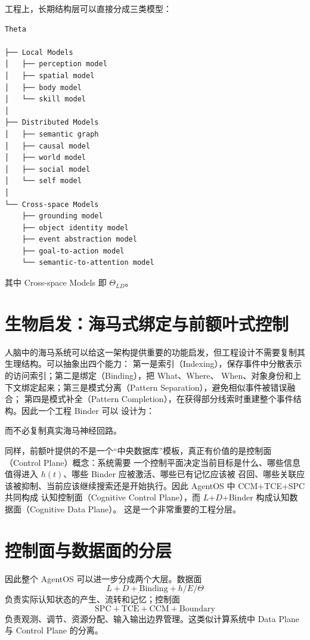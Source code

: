 工程上，长期结构层可以直接分成三类模型：

\begin{verbatim}
Theta

├── Local Models
│   ├── perception model
│   ├── spatial model
│   ├── body model
│   └── skill model
│
├── Distributed Models
│   ├── semantic graph
│   ├── causal model
│   ├── world model
│   ├── social model
│   └── self model
│
└── Cross-space Models
    ├── grounding model
    ├── object identity model
    ├── event abstraction model
    ├── goal-to-action model
    └── semantic-to-attention model
\end{verbatim}

其中 Cross-space Models 即 $\Theta_{LD}$。

\section{生物启发：海马式绑定与前额叶式控制}

人脑中的海马系统可以给这一架构提供重要的功能启发，但工程设计不需要复制其生理结构。可以抽象出四个能力：
第一是索引（Indexing），保存事件中分散表示的访问索引；第二是绑定（Binding），把 What、Where、
When、对象身份和上下文绑定起来；第三是模式分离（Pattern Separation），避免相似事件被错误融合；
第四是模式补全（Pattern Completion），在获得部分线索时重建整个事件结构。因此一个工程 Binder 可以
设计为：

\begin{statementbox}
\centering
{}
\end{statementbox}

而不必复制真实海马神经回路。

同样，前额叶提供的不是一个“中央数据库”模板，真正有价值的是控制面（Control Plane）概念：系统需要
一个控制平面决定当前目标是什么、哪些信息值得进入 $h(t)$、哪些 Binder 应被激活、哪些已有记忆应该被
召回、哪些关联应该被抑制、当前应该继续搜索还是开始执行。因此 AgentOS 中 CCM+TCE+SPC 共同构成
认知控制面（Cognitive Control Plane），而 $L$+$D$+Binder 构成认知数据面（Cognitive Data Plane）。
这是一个非常重要的工程分层。

\section{控制面与数据面的分层}

因此整个 AgentOS 可以进一步分成两个大层。数据面
\[
\boxed{
L+D+\mathrm{Binding}+h/E/\Theta
}
\]
负责实际认知状态的产生、流转和记忆；控制面
\[
\boxed{
\mathrm{SPC}+\mathrm{TCE}+\mathrm{CCM}+\mathrm{Boundary}
}
\]
负责观测、调节、资源分配、输入输出边界管理。这类似计算系统中 Data Plane 与 Control Plane 的分离。


